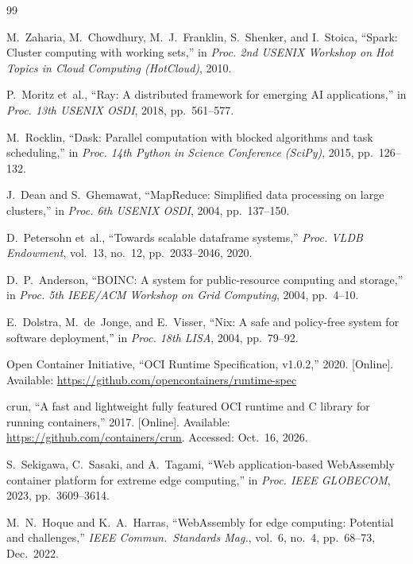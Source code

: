 \clearpage
{}
{}
{\small\singlespacing
\begin{thebibliography}{99}
\setlength{\itemsep}{0pt}\setlength{\parskip}{0pt}

M.~Zaharia, M.~Chowdhury, M.~J.~Franklin, S.~Shenker, and I.~Stoica,
``Spark: Cluster computing with working sets,''
in \textit{Proc. 2nd USENIX Workshop on Hot Topics in Cloud Computing (HotCloud)}, 2010.

P.~Moritz et~al.,
``Ray: A distributed framework for emerging AI applications,''
in \textit{Proc. 13th USENIX OSDI}, 2018, pp.~561--577.

M.~Rocklin,
``Dask: Parallel computation with blocked algorithms and task scheduling,''
in \textit{Proc. 14th Python in Science Conference (SciPy)}, 2015, pp.~126--132.

J.~Dean and S.~Ghemawat,
``MapReduce: Simplified data processing on large clusters,''
in \textit{Proc. 6th USENIX OSDI}, 2004, pp.~137--150.

D.~Petersohn et~al.,
``Towards scalable dataframe systems,''
\textit{Proc. VLDB Endowment}, vol.~13, no.~12, pp.~2033--2046, 2020.

D.~P.~Anderson,
``BOINC: A system for public-resource computing and storage,''
in \textit{Proc. 5th IEEE/ACM Workshop on Grid Computing}, 2004, pp.~4--10.

E.~Dolstra, M.~de~Jonge, and E.~Visser,
``Nix: A safe and policy-free system for software deployment,''
in \textit{Proc. 18th LISA}, 2004, pp.~79--92.

Open Container Initiative,
``OCI Runtime Specification, v1.0.2,'' 2020. [Online]. Available:
\url{https://github.com/opencontainers/runtime-spec}

 crun, ``A fast and lightweight fully featured OCI runtime and C library for running containers,'' 2017. [Online]. Available: \url{https://github.com/containers/crun}. Accessed: Oct.~16, 2026.

S.~Sekigawa, C.~Sasaki, and A.~Tagami,
``Web application-based WebAssembly container platform for extreme edge computing,''
in \textit{Proc. IEEE GLOBECOM}, 2023, pp.~3609--3614.

M.~N.~Hoque and K.~A.~Harras,
``WebAssembly for edge computing: Potential and challenges,''
\textit{IEEE Commun.\ Standards Mag.}, vol.~6, no.~4, pp.~68--73, Dec.\ 2022.


\end{thebibliography}}
